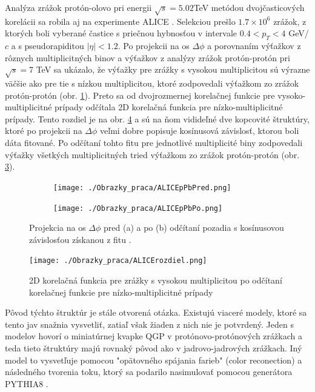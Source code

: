 \documentclass[thesismargins, thesislinespacing]{rnthesis}
\begin{document}
Analýza zrážok protón-olovo pri energii $\sqrt{s}=5.02$TeV metódou dvojčasticových korelácii sa robila aj na experimente ALICE \cite{AlicepPb}. Selekciou prešlo $1.7\times10^6$ zrážok, z ktorých boli vyberané častice s priečnou hybnosťou v intervale $0.4<p_T<4$ GeV/$c$ a s pseudorapiditou $|\eta|<1.2$. Po projekcii na os $\Delta \phi$ a porovnaním výťažkov z rôznych multiplicitných binov a výťažkov z analýzy zrážok protón-protón pri $\sqrt{s}=$7 TeV sa ukázalo, že výťažky pre zrážky s vysokou multiplicitou sú výrazne väčšie ako pre tie s nízkou multiplicitou, ktoré zodpovedali výťažkom zo zrážok protón-protón (obr. \ref{ALICEpPBPhiPred}). Preto sa od dvojrozmernej korelačnej funkcie pre vysoko-multiplicitné prípady odčítala 2D korelačná funkcia pre nízko-multiplicitné prípady. Tento rozdiel je na obr. \ref{ALICErozdiel} a sú na ňom vidideľné dve kopcovité štruktúry, ktoré po projekcii na $\Delta \phi$ veľmi dobre popisuje kosínusová závislosť, ktorou boli dáta fitované. Po odčítaní tohto fitu pre jednotlivé multiplicité biny zodpovedali výťažky všetkých multiplicitných tried výťažkom zo zrážok protón-protón (obr. \ref{ALICEpPBPhiPo}).

\begin{figure}[hbtp!]
	\centering
	\begin{subfigure}{0.5\textwidth}
		\centering
		\texttt{[image: ./Obrazky\_praca/ALICEpPbPred.png]}
		\caption{}
		\label{ALICEpPBPhiPred}
	\end{subfigure}%
	\begin{subfigure}{0.5\textwidth}
		\centering
		\texttt{[image: ./Obrazky\_praca/ALICEpPbPo.png]}
		\caption{}
		\label{ALICEpPBPhiPo}
	\end{subfigure}
	\caption{Projekcia na os $\Delta \phi$ pred (a) a po (b) odčítaní pozadia s kosínusovou závislosťou získanou z fitu \cite{AlicepPb}.}
\end{figure}

\begin{figure}[hbtp!]
	\centering
	\texttt{[image: ./Obrazky\_praca/ALICErozdiel.png]}
	
	\caption{2D korelačná funkcia pre zrážky s vysokou multiplicitou po odčítaní korelačnej funkcie pre nízko-multiplicitné prípady \cite{AlicepPb}}
	\label{ALICErozdiel}
\end{figure}
Pôvod týchto štruktúr je stále otvorená otázka. Existujú viaceré modely, ktoré sa tento jav snažnia vysvetliť, zatiaľ však žiaden z nich nie je potvrdený. Jeden s modelov hovorí o miniatúrnej kvapke QGP v protónovo-protónových zrážkach a teda tieto štruktúry majú rovnaký pôvod ako v jadrovo-jadrových zrážkach. Iný model to vysvetľuje pomocou "\-opätovného spájania farieb" (color reconection) a  následného tvorenia toku, ktorý sa podarilo nasimulovať pomocou generátora PYTHIA8 \cite{flowPP}.
\end{document}

